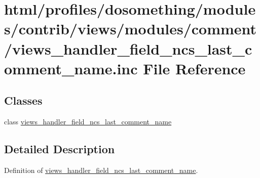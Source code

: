 \hypertarget{views__handler__field__ncs__last__comment__name_8inc}{
\section{html/profiles/dosomething/modules/contrib/views/modules/comment/views\_\-handler\_\-field\_\-ncs\_\-last\_\-comment\_\-name.inc File Reference}
\label{views__handler__field__ncs__last__comment__name_8inc}
}
\subsection*{Classes}
\begin{DoxyCompactItemize}
\item 
class \hyperlink{classviews__handler__field__ncs__last__comment__name}{views\_\-handler\_\-field\_\-ncs\_\-last\_\-comment\_\-name}
\end{DoxyCompactItemize}


\subsection{Detailed Description}
Definition of \hyperlink{classviews__handler__field__ncs__last__comment__name}{views\_\-handler\_\-field\_\-ncs\_\-last\_\-comment\_\-name}. 